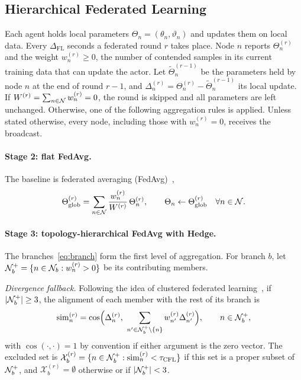 \begin{EnChapter}
\section{Hierarchical Federated Learning}
\label{subsec:fl}

Each agent holds local parameters $\Theta_n = (\theta_n, \vartheta_n)$ and updates
them on local data. Every $\Delta_{\mathrm{FL}}$ seconds a federated round $r$ takes
place. Node $n$ reports $\Theta_n^{(r)}$ and the weight $w_n^{(r)} \ge 0$, the number
of contended samples in its current training data that can update the actor. Let
$\tilde\Theta_n^{(r-1)}$ be the parameters held by node $n$ at the end of round
$r-1$, and $\Delta_n^{(r)} = \Theta_n^{(r)} - \tilde\Theta_n^{(r-1)}$ its local
update. If $W^{(r)} = \sum_{n \in \mathcal{N}} w_n^{(r)} = 0$, the round is skipped and
all parameters are left unchanged. Otherwise, one of the following aggregation
rules is applied. Unless stated otherwise, every node, including those with
$w_n^{(r)} = 0$, receives the broadcast.

\paragraph{Stage 2: flat FedAvg.}
The baseline is federated averaging (FedAvg)~\cite{mcmahan2017fedavg},
\begin{equation}
  \Theta_{\mathrm{glob}}^{(r)} = \sum_{n \in \mathcal{N}} \frac{w_n^{(r)}}{W^{(r)}}\, \Theta_n^{(r)}, \qquad \Theta_n \leftarrow \Theta_{\mathrm{glob}}^{(r)} \quad \forall n \in \mathcal{N}.
  \label{eq:fedavg}
\end{equation}

\paragraph{Stage 3: topology-hierarchical FedAvg with Hedge.}
The branches~\eqref{eq:branch} form the first level of aggregation.
For branch $b$, let $\mathcal{N}_b^{+} = \{n \in \mathcal{N}_b : w_n^{(r)} > 0\}$ be its
contributing members.

\emph{Divergence fallback.} Following the idea of clustered federated
learning~\cite{sattler2021cfl}, if $|\mathcal{N}_b^{+}| \ge 3$, the alignment of each member
with the rest of its branch is
\begin{equation}
  \operatorname{sim}_n^{(r)} = \cos\Bigl( \Delta_n^{(r)},\ \sum_{n' \in \mathcal{N}_b^{+} \setminus \{n\}} w_{n'}^{(r)} \Delta_{n'}^{(r)} \Bigr), \qquad n \in \mathcal{N}_b^{+},
  \label{eq:cfl}
\end{equation}
with $\cos(\cdot,\cdot) = 1$ by convention if either argument is the zero vector.
The excluded set is $\mathcal{X}_b^{(r)} = \{ n \in \mathcal{N}_b^{+} : \operatorname{sim}_n^{(r)} < \tau_{\mathrm{CFL}} \}$
if this set is a proper subset of $\mathcal{N}_b^{+}$, and $\mathcal{X}_b^{(r)} = \emptyset$
otherwise or if $|\mathcal{N}_b^{+}| < 3$.


\end{EnChapter}
